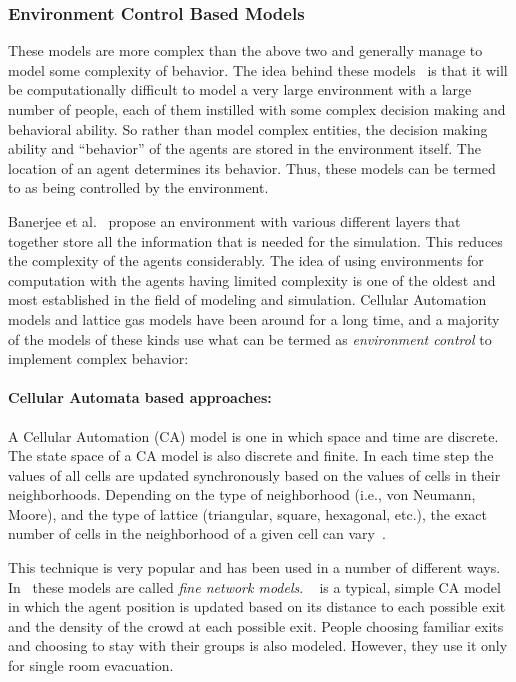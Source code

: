 \subsubsection{Environment Control Based Models}

These models are more complex than the above two and generally manage to model some complexity of behavior. The idea behind these models~\cite{Banerjee:2008jh} is that it will be computationally difficult to model a very large environment with a large number of people, each of them instilled with some complex decision making and behavioral ability. So rather than model complex entities, the decision making ability and ``behavior'' of the agents are stored in the environment itself. The location of an agent determines its behavior. Thus, these models can be termed to as being controlled by the environment.

Banerjee et al.~\cite{Banerjee:2008jh,Banerjee:2009jo} propose an environment with various different layers that together store all the information that is needed for the simulation. This reduces the complexity of the agents considerably. The idea of using environments for computation with the agents having limited complexity is one of the oldest and most established in the field of modeling and simulation. Cellular Automation models and lattice gas models have been around for a long time, and a majority of the models of these kinds use what can be termed as \emph{environment control} to implement complex behavior:

\paragraph{Cellular Automata based approaches:}

 A Cellular Automation (CA) model is one in which space and time are discrete. The state space of a CA model is also discrete and finite. In each time step the values of all cells are updated synchronously based on the values of cells in their neighborhoods. Depending on the type of neighborhood (i.e., von Neumann, Moore), and the type of lattice (triangular, square, hexagonal, etc.), the exact number of cells in the neighborhood of a given cell can vary~\cite{Hoekstra:2010}.

 This technique is very popular and has been used in a number of different ways. In~\cite{Gwynne:1999vi,Kuligowski:2005tt} these models are called \emph{fine network models}.
~\cite{Yuan:2007ja} is a typical, simple CA model in which the agent position is updated based on its distance to each possible exit and the density of the crowd at each possible exit. People choosing familiar exits and choosing to stay with their groups is also modeled. However, they use it only for single room evacuation.


